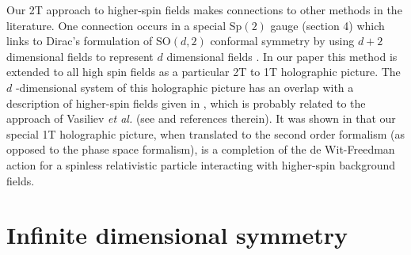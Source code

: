 \documentclass[a4paper,12pt]{article}
\begin{document}
Our 2T approach to higher-spin fields makes connections to other methods in
the literature. One connection occurs in a special Sp$\left( 2\right) $
gauge (section 4) which links to Dirac's formulation of SO$\left( d,2\right)
$ conformal symmetry by using $d+2$ dimensional fields to represent $d$
dimensional fields \cite{dirac}. In our paper this method is extended to all
high spin fields as a particular 2T to 1T holographic picture. The $d$%
-dimensional system of this holographic picture has an overlap with a
description of higher-spin fields given in \cite{segal}, which is probably
related to the approach of Vasiliev \textit{et al.} (see \cite{vasiliev} and
references therein). It was shown in \cite{segal} that our special 1T
holographic picture, when translated to the second order formalism (as
opposed to the phase space formalism), is a completion of the de
Wit-Freedman action \cite{dwitf} for a spinless relativistic particle
interacting with higher-spin background fields.

\section{Infinite dimensional symmetry}
\end{document}
